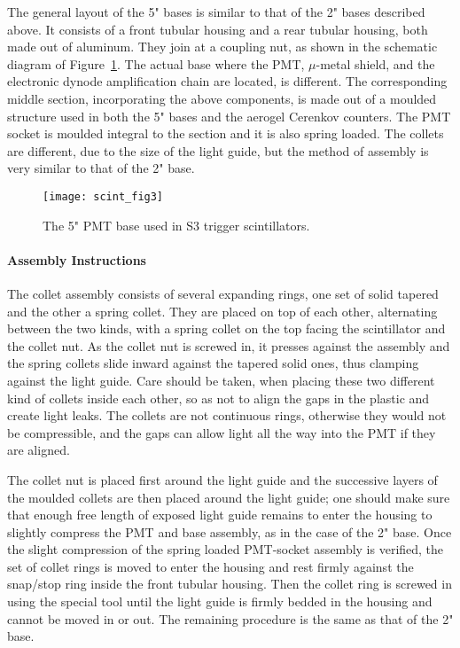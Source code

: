    The general layout of the 5" bases is similar to that of the 2" bases
described above. It consists of a front tubular housing and a rear tubular
housing, both made out of aluminum. They join at a coupling nut, as shown in
the schematic diagram of Figure~\ref{fig:scint_3}. The actual
base where the PMT, $\mu$-metal
shield, and the electronic dynode amplification chain are located, is
different. The corresponding middle section, incorporating the above
components, is made out of a moulded structure used in both the 5" bases and
the aerogel Cerenkov counters. The PMT socket is moulded integral to the
section and it is also spring loaded. The collets are different, due to the
size of the light guide, but the method of assembly is very similar to that of
the 2" base. 

\begin{figure}[tbh]
\begin{center}
\texttt{[image: scint\_fig3]}
{\linespread{1.}
\caption[Detectors: 5'' PMT Base]{The 5" PMT base used in S3 trigger scintillators.}
\label{fig:scint_3}}
\end{center}
\end{figure}


\paragraph{Assembly Instructions}

   The collet assembly consists of several expanding rings, one set of solid
tapered and the other a spring collet. They are placed on top of each other,
alternating between the two kinds, with a spring collet on the top facing the
scintillator and the collet nut. As the collet nut is screwed in, it presses
against the assembly and the spring collets slide inward against the tapered
solid ones, thus clamping against the light guide. Care should be taken, when
placing these two different kind of collets inside each other, so as not to
align the gaps in the plastic and create light leaks. The collets are not
continuous rings, otherwise they would not be compressible, and the gaps can
allow light all the way into the PMT if they are aligned. 

The collet nut is placed first around the light guide and the successive layers 
of the moulded collets are then placed around the light guide; one should make 
sure that enough free length of exposed light guide remains to enter the 
housing to slightly compress the PMT and base assembly, as in the case of the 
2" base. Once the slight compression of the spring loaded PMT-socket assembly 
is verified, the set of collet rings is moved to enter the housing and rest 
firmly against the snap/stop ring inside the front tubular housing. Then the 
collet ring is screwed in using the special tool until the light guide is 
firmly bedded in the housing and cannot be moved in or out. The remaining 
procedure is the same as that of the 2" base.

